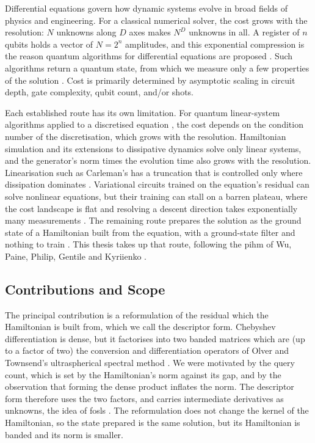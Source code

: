 Differential equations govern how dynamic systems evolve in broad fields of physics and engineering. For a classical numerical solver, the cost grows with the resolution: $N$ unknowns along $D$ axes makes $N^D$ unknowns in all. A register of $n$ qubits holds a vector of $N=2^n$ amplitudes, and this exponential compression is the reason quantum algorithms for differential equations are proposed \cite{berry2014highorder,childsliu2020spectral,liu2021carleman}. Such algorithms return a quantum state, from which we measure only a few properties of the solution \cite{aaronson2015fineprint}. Cost is primarily determined by asymptotic scaling in circuit depth, gate complexity, qubit count, and/or shots.

Each established route has its own limitation. For quantum linear-system algorithms applied to a discretised equation \cite{berry2014highorder,childsliu2020spectral}, the cost depends on the condition number of the discretisation, which grows with the resolution. Hamiltonian simulation and its extensions to dissipative dynamics \cite{anliulin2023lchs,jinliuyu2023schrodingerisation} solve only linear systems, and the generator's norm times the evolution time also grows with the resolution. Linearisation such as Carleman's has a truncation that is controlled only where dissipation dominates \cite{liu2021carleman}. Variational circuits trained on the equation's residual \cite{lubasch2020variational,kyriienko2021differentiable} can solve nonlinear equations, but their training can stall on a barren plateau, where the cost landscape is flat and resolving a descent direction takes exponentially many measurements \cite{larocca2025barren}. The remaining route prepares the solution as the ground state of a Hamiltonian built from the equation, with a ground-state filter and nothing to train \cite{lintong2020filtering}. This thesis takes up that route, following the \gls{pihm} of Wu, Paine, Philip, Gentile and Kyriienko \cite{wu2025pihm}.

\subsection{Contributions and Scope}
\label{sec:contributions}

The principal contribution is a reformulation of the residual which the Hamiltonian is built from, which we call the descriptor form. Chebyshev differentiation is dense, but it factorises into two banded matrices which are (up to a factor of two) the conversion and differentiation operators of Olver and Townsend's ultraspherical spectral method \cite{olver2013}. We were motivated by the query count, which is set by the Hamiltonian's norm against its gap, and by the observation that forming the dense product inflates the norm. The descriptor form therefore uses the two factors, and carries intermediate derivatives as unknowns, the idea of \gls{fosls} \cite{cai1994fosls}. The reformulation does not change the kernel of the Hamiltonian, so the state prepared is the same solution, but its Hamiltonian is banded and its norm is smaller.

